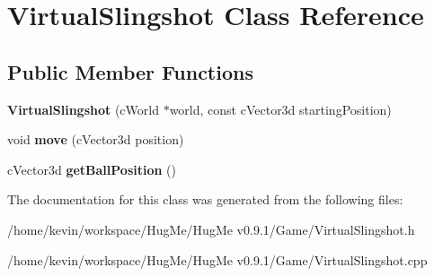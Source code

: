 \hypertarget{classVirtualSlingshot}{
\section{VirtualSlingshot Class Reference}
\label{classVirtualSlingshot}
}
\subsection*{Public Member Functions}
\begin{DoxyCompactItemize}
\item 
\hypertarget{classVirtualSlingshot_a5103bd90514183171736a73c02bb1940}{
{\bfseries VirtualSlingshot} (cWorld $\ast$world, const cVector3d startingPosition)}
\label{classVirtualSlingshot_a5103bd90514183171736a73c02bb1940}

\item 
\hypertarget{classVirtualSlingshot_ab1b888f0b9982ced892d3f4ad6cc5eb9}{
void {\bfseries move} (cVector3d position)}
\label{classVirtualSlingshot_ab1b888f0b9982ced892d3f4ad6cc5eb9}

\item 
\hypertarget{classVirtualSlingshot_a6ab9b13ce2ed3d9a5c4b7d09e844a62f}{
cVector3d {\bfseries getBallPosition} ()}
\label{classVirtualSlingshot_a6ab9b13ce2ed3d9a5c4b7d09e844a62f}

\end{DoxyCompactItemize}


The documentation for this class was generated from the following files:\begin{DoxyCompactItemize}
\item 
/home/kevin/workspace/HugMe/HugMe v0.9.1/Game/VirtualSlingshot.h\item 
/home/kevin/workspace/HugMe/HugMe v0.9.1/Game/VirtualSlingshot.cpp\end{DoxyCompactItemize}
